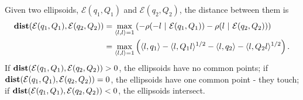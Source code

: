 \documentclass[letterpaper,10pt,english]{sphinxmanual}
\begin{document}
Given two ellipsoids, ${\mathcal E}(q_1,Q_1)$ and
${\mathcal E}(q_2,Q_2)$, the distance between them is
\label{chap_ellcalc:equation-dist_ell}\begin{gather}
\begin{split}\begin{aligned}
{\bf dist}({\mathcal E}(q_1,Q_1),{\mathcal E}(q_2,Q_2)) & = \max_{\langle l,l\rangle=1}
\left(-\rho(-l ~|~ {\mathcal E}(q_1,Q_1)) - \rho(l ~|~ {\mathcal E}(q_2,Q_2))\right) \\
& = \max_{\langle l,l\rangle=1}\left(\langle l,q_1\rangle -
\langle l,Q_1l\rangle^{1/2} - \langle l,q_2\rangle -
\langle l,Q_2l\rangle^{1/2}\right).
\end{aligned}\end{split}\label{chap_ellcalc-dist_ell}
\end{gather}
If ${\bf dist}({\mathcal E}(q_1,Q_1),{\mathcal E}(q_2,Q_2)) > 0$,
the ellipsoids have no common points; if
${\bf dist}({\mathcal E}(q_1,Q_1),{\mathcal E}(q_2,Q_2)) = 0$, the
ellipsoids have one common point - they touch; if
${\bf dist}({\mathcal E}(q_1,Q_1),{\mathcal E}(q_2,Q_2)) < 0$, the
ellipsoids intersect.
\end{document}
